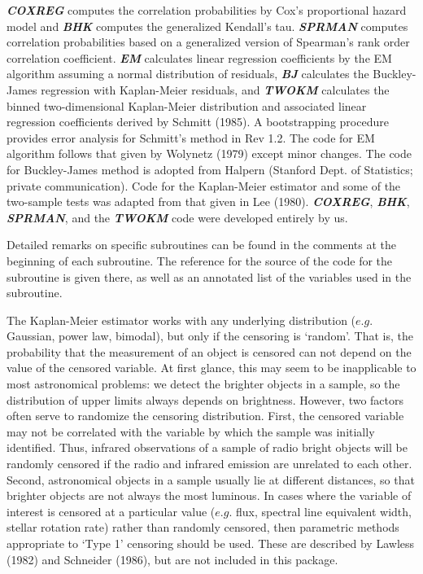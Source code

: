 	{\sl\bf COXREG} computes the correlation probabilities by Cox's 
proportional hazard model and {\sl\bf BHK} computes the generalized 
Kendall's tau.  {\sl\bf SPRMAN} computes correlation probabilities 
based on a generalized version of Spearman's rank order correlation 
coefficient.  {\sl\bf EM} calculates linear regression 
coefficients by  the EM algorithm assuming a normal distribution of
residuals, {\sl\bf BJ} calculates the Buckley-James regression with 
Kaplan-Meier residuals, and {\sl\bf TWOKM} calculates the binned 
two-dimensional Kaplan-Meier distribution and  associated linear 
regression coefficients derived by Schmitt (1985).  A bootstrapping 
procedure provides error analysis for Schmitt's method in Rev 1.2.  The 
code for EM algorithm follows that given by 
Wolynetz (1979) except minor changes. The code for Buckley-James method 
is adopted from Halpern (Stanford Dept. of Statistics; private 
communication).  Code for the Kaplan-Meier estimator and some of the 
two-sample tests was adapted from that given in Lee (1980).  {\sl\bf COXREG}, 
{\sl\bf BHK}, {\sl\bf SPRMAN}, and the {\sl\bf TWOKM} code were developed 
entirely by us.
   
     Detailed remarks on specific subroutines can be found in the comments at 
the beginning of each subroutine.  The reference for the source of the code 
for the subroutine is given there, as well as an annotated list of the 
variables used in the subroutine.

\newpage
{}
 
     The Kaplan-Meier estimator works with any underlying distribution
($e.g.$ Gaussian, power law, bimodal), but only if the censoring is `random'.
That is, the probability that the measurement of an object is censored can
not depend on the value of the censored variable.   At first glance, this
may seem to be inapplicable to most astronomical problems:  we detect the
brighter objects in a sample, so the distribution of upper limits always 
depends on brightness.  However, two factors often serve to randomize 
the censoring distribution.  First, the censored variable may not be 
correlated with the variable by which the sample was initially 
identified.  Thus, infrared observations of a sample of radio bright 
objects will be randomly censored if the radio and infrared emission are
unrelated to each other.  Second, astronomical objects in a sample usually
lie at different distances, so that brighter objects are not always the 
most luminous.  In cases where the variable of interest is censored at 
a particular value ($e.g.$ flux, spectral line equivalent width, stellar 
rotation rate)  rather than randomly censored, then parametric methods 
appropriate to `Type 1' censoring should be used.  These are described by 
Lawless (1982) and Schneider (1986), but are not included in this package.
 
